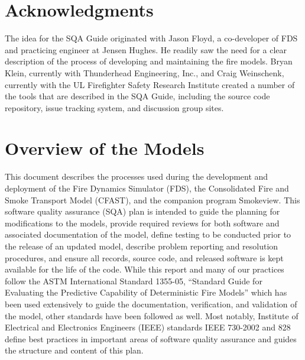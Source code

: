 \documentclass[11pt]{book}
\begin{document}
%


\chapter{Acknowledgments}

\label{acksection}

The idea for the SQA Guide originated with Jason Floyd, a co-developer of FDS and practicing engineer at Jensen Hughes. He readily saw the need for a clear description of the process of developing and maintaining the fire models. Bryan Klein, currently with Thunderhead Engineering, Inc., and Craig Weinschenk, currently with the UL Firefighter Safety Research Institute created a number of the tools that are described in the SQA Guide, including the source code repository, issue tracking system, and discussion group sites.


\newpage

\tableofcontents

\mainmatter

\chapter{Overview of the Models}

This document describes the processes used during the development and deployment of the Fire Dynamics Simulator (FDS), the Consolidated Fire and Smoke Transport Model (CFAST), and the companion program Smokeview.  This software quality assurance (SQA) plan is intended to guide the planning for modifications to the models, provide required reviews for both software and associated documentation of the model, define testing to be conducted prior to the release of an updated model, describe problem reporting and resolution procedures, and ensure all records, source code, and released software is kept available for the life of the code.  While this report and many of our practices follow the ASTM International Standard 1355-05, ``Standard Guide for Evaluating the Predictive Capability of Deterministic Fire Models'' \cite{ASTM:E1355} which has been used extensively to guide the documentation, verification, and validation of the model, other standards have been followed as well.  Most notably, Institute of Electrical and Electronics Engineers (IEEE) standards IEEE 730-2002 \cite{IEEE:730} and 828~\cite{IEEE-828} define best practices in important areas of software quality assurance and guides the structure and content of this plan.
\end{document}
